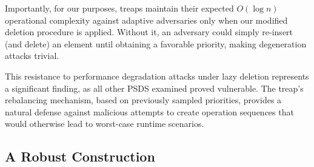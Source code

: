 Importantly, for our purposes, treaps maintain their expected $O(\log n)$ operational complexity against adaptive adversaries only when our modified deletion procedure is applied. Without it, an adversary could simply re-insert (and delete) an element until obtaining a favorable priority, making degeneration attacks trivial.

This resistance to performance degradation attacks under lazy deletion represents a significant finding, as all other PSDS examined proved vulnerable. The treap's rebalancing mechanism, based on previously sampled priorities, provides a natural defense against malicious attempts to create operation sequences that would otherwise lead to worst-case runtime scenarios.

\subsection{A Robust Construction}

